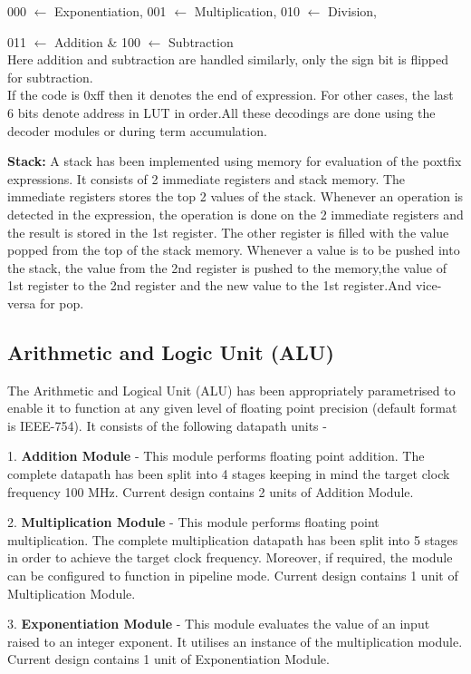 000 $\leftarrow$ Exponentiation, 001 $\leftarrow$ Multiplication, 010 $\leftarrow$ Division,

011 $\leftarrow$ Addition \& 100 $\leftarrow$ Subtraction\\
Here addition and subtraction are handled similarly, only the sign bit is flipped for subtraction.\\
If the code is 0xff then it denotes the end of expression. For other cases, the last 6 bits denote address in LUT in order.All these decodings are done using the decoder modules or during term accumulation. 

\textbf{Stack:} A stack has been implemented using memory for evaluation of the poxtfix expressions. It consists of 2 immediate registers and stack memory. The immediate registers stores the top 2 values of the stack. Whenever an operation is detected in the expression, the operation is done on the 2 immediate registers and the result is stored in the 1st register. The other register is filled with the value popped from the top of the stack memory. Whenever a value is to be pushed into the stack, the value from the 2nd register is pushed to the memory,the value of 1st register to the 2nd register and the new value to the 1st register.And vice-versa for pop. 

\subsection{Arithmetic and Logic Unit (ALU)}
The Arithmetic and Logical Unit (ALU) has been appropriately parametrised to enable it to function at any given level of floating point precision (default format is IEEE-754). It consists of the following datapath units -

1. {\bf Addition Module} - This module performs floating point addition. The complete datapath has been split into 4 stages keeping in mind the target clock frequency 100 MHz. Current design contains 2 units of Addition Module.

2. {\bf Multiplication Module} - This module performs floating point multiplication. The complete multiplication datapath has been split into 5 stages in order to achieve the target clock frequency. Moreover, if required, the module can be configured to function in pipeline mode. Current design contains 1 unit of Multiplication Module.

3. {\bf Exponentiation Module} - This module evaluates the value of an input raised to an integer exponent. It utilises an instance of the multiplication module. Current design contains 1 unit of Exponentiation Module.

